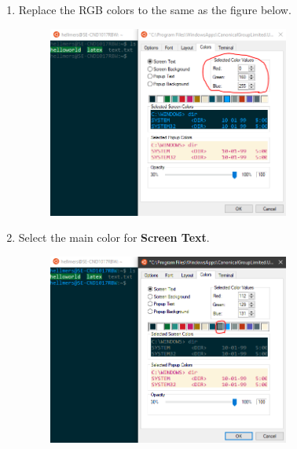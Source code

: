 \begin{enumerate}[a)]
\begin{enumerate}[1.]
        \item Replace the RGB colors to the same as the figure below.
        \begin{figure}[H]
            \centering
            \includegraphics[width=0.75\textwidth]{tex/WSL/Ubuntu_terminal_colors/Figures/12.PNG}
        \end{figure}
        
        \item Select the main color for \textbf{Screen Text}.
        \begin{figure}[H]
            \centering
            \includegraphics[width=0.75\textwidth]{tex/WSL/Ubuntu_terminal_colors/Figures/13.PNG}
        \end{figure}
        

\end{enumerate}
\end{enumerate}
